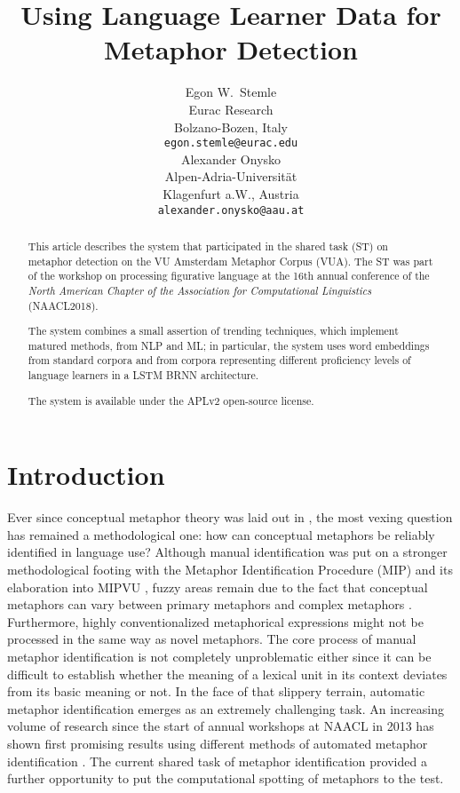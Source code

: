 \documentclass[11pt,a4paper]{article}
\title{Using Language Learner Data for Metaphor Detection}
\author{Egon W.~Stemle \\
  Eurac Research \\
  Bolzano-Bozen, Italy \\
  {\tt egon.stemle@eurac.edu} \\\And
  Alexander Onysko \\
  Alpen-Adria-Universität \\
  Klagenfurt a.W., Austria \\
  {\tt alexander.onysko@aau.at} \\}
\date{}
\begin{document}
\maketitle
\begin{abstract}
This article describes the system that participated in the shared task (ST) on metaphor detection \cite{Leong2018ATask} on the VU Amsterdam Metaphor Corpus (VUA).
The ST was part of the workshop on processing figurative language at the 16th annual conference of the \emph{North American Chapter of the Association for Computational Linguistics} (NAACL2018).

The system combines a small assertion of trending techniques, which implement matured methods, from NLP and ML; 
in particular, the system uses word embeddings from standard corpora and from corpora representing different proficiency levels of language learners in a LSTM BRNN architecture.

The system is available under the APLv2 open-source license.
\end{abstract}


\section{Introduction} %
\label{sec:intro}
 
Ever since conceptual metaphor theory was laid out in , the most vexing question has remained a methodological one: how can conceptual metaphors be reliably identified in language use? Although manual identification was put on a stronger methodological footing with the Metaphor Identification Procedure (MIP) \cite{doi:10.1080/10926480709336752} and its elaboration into MIPVU \cite{Steen2010}, fuzzy areas remain due to the fact that conceptual metaphors can vary between primary metaphors and complex metaphors \cite[cf.][]{Grady1997}. 
Furthermore, highly conventionalized metaphorical expressions might not be processed in the same way as novel metaphors. The core process of manual metaphor identification is not completely unproblematic either since it can be difficult to establish whether the meaning of a lexical unit in its context deviates from its basic meaning or not. 
In the face of that slippery terrain, automatic metaphor identification emerges as an extremely challenging task. 
An increasing volume of research since the start of annual workshops at NAACL in 2013 has shown first promising results using different methods of automated metaphor identification \cite[cf.][]{W13-0900,W14-2300,W15-1400,W16-1100}.
The current shared task of metaphor identification provided a further opportunity to put the computational spotting of metaphors to the test.
\end{document}

